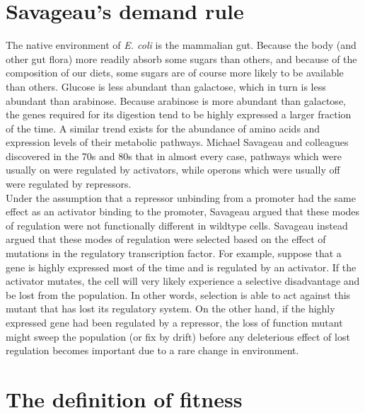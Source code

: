 \documentclass{article}
\begin{document}
\large

\section*{Savageau's demand rule}

The native environment of \textit{E. coli} is the mammalian gut. Because the body (and other gut flora) more readily absorb some sugars than others, and because of the composition of our diets, some sugars are of course more likely to be available than others. Glucose is less abundant than galactose, which in turn is less abundant than arabinose. Because arabinose is more abundant than galactose, the genes required for its digestion tend to be highly expressed a larger fraction of the time. A similar trend exists for the abundance of amino acids and expression levels of their metabolic pathways. Michael Savageau and colleagues discovered in the 70s and 80s that in almost every case, pathways which were usually on were regulated by activators, while operons which were usually off were regulated by repressors.\\

Under the assumption that a repressor unbinding from a promoter had the same effect as an activator binding to the promoter, Savageau argued that these modes of regulation were not functionally different in wildtype cells. Savageau instead argued that these modes of regulation were selected based on the effect of mutations in the regulatory transcription factor. For example, suppose that a gene is highly expressed most of the time and is regulated by an activator. If the activator mutates, the cell will very likely experience a selective disadvantage and be lost from the population. In other words, selection is able to act against this mutant that has lost its regulatory system. On the other hand, if the highly expressed gene had been regulated by a repressor, the loss of function mutant might sweep the population (or fix by drift) before any deleterious effect of lost regulation becomes important due to a rare change in environment.

\section*{The definition of fitness}
\end{document}
